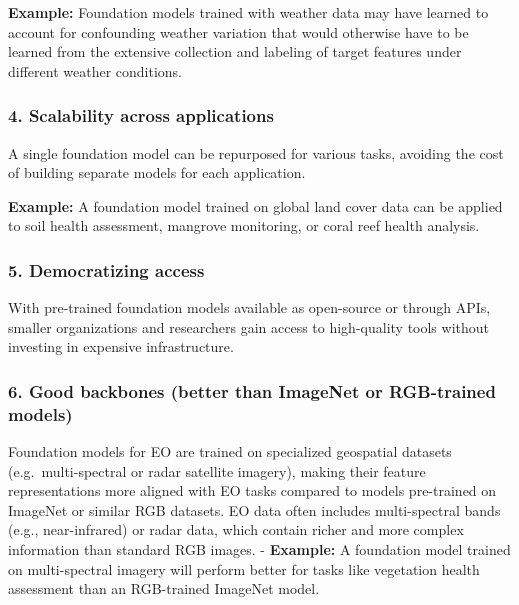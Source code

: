 \documentclass[
  letterpaper,
  DIV=11,
  numbers=noendperiod]{scrreprt}
\begin{document}
\textbf{Example:} Foundation models trained with weather data may have
learned to account for confounding weather variation that would
otherwise have to be learned from the extensive collection and labeling
of target features under different weather conditions.

\subsubsection{\texorpdfstring{\textbf{4. Scalability across
applications}}{4. Scalability across applications}}\label{scalability-across-applications}

A single foundation model can be repurposed for various tasks, avoiding
the cost of building separate models for each application.

\textbf{Example:} A foundation model trained on global land cover data
can be applied to soil health assessment, mangrove monitoring, or coral
reef health analysis.

\subsubsection{\texorpdfstring{\textbf{5. Democratizing
access}}{5. Democratizing access}}\label{democratizing-access}

With pre-trained foundation models available as open-source or through
APIs, smaller organizations and researchers gain access to high-quality
tools without investing in expensive infrastructure.

\subsubsection{\texorpdfstring{\textbf{6. Good backbones (better than
ImageNet or RGB-trained
models)}}{6. Good backbones (better than ImageNet or RGB-trained models)}}\label{good-backbones-better-than-imagenet-or-rgb-trained-models}

Foundation models for EO are trained on specialized geospatial datasets
(e.g.~multi-spectral or radar satellite imagery), making their feature
representations more aligned with EO tasks compared to models
pre-trained on ImageNet or similar RGB datasets. EO data often includes
multi-spectral bands (e.g., near-infrared) or radar data, which contain
richer and more complex information than standard RGB images. -
\textbf{Example:} A foundation model trained on multi-spectral imagery
will perform better for tasks like vegetation health assessment than an
RGB-trained ImageNet model.
\end{document}
